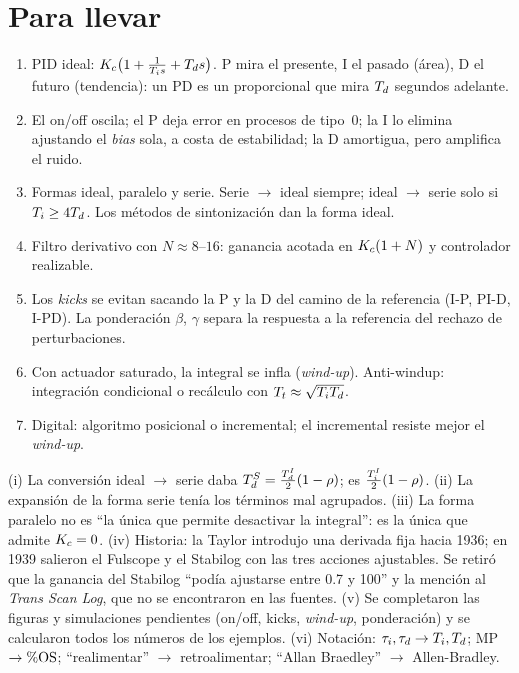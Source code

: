 \section{Para llevar}
\label{sec:pn-cierre}

\begin{parallevar}
\begin{enumerate}
  \item PID ideal: $K_c\bigl(1+\frac{1}{T_i s}+T_d s\bigr)$. P mira el presente, I el pasado (área), D el futuro (tendencia): un PD es un proporcional que mira $T_d$ segundos adelante.
  \item El on/off oscila; el P deja error en procesos de tipo~0; la I lo elimina ajustando el \emph{bias} sola, a costa de estabilidad; la D amortigua, pero amplifica el ruido.
  \item Formas ideal, paralelo y serie. Serie $\to$ ideal siempre; ideal $\to$ serie solo si $T_i\ge4T_d$. Los métodos de sintonización dan la forma ideal.
  \item Filtro derivativo con $N\approx8$--$16$: ganancia acotada en $K_c(1+N)$ y controlador realizable.
  \item Los \emph{kicks} se evitan sacando la P y la D del camino de la referencia (I-P, PI-D, I-PD). La ponderación $\beta$, $\gamma$ separa la respuesta a la referencia del rechazo de perturbaciones.
  \item Con actuador saturado, la integral se infla (\emph{wind-up}). Anti-windup: integración condicional o recálculo con $T_t\approx\sqrt{T_iT_d}$.
  \item Digital: algoritmo posicional o incremental; el incremental resiste mejor el \emph{wind-up}.
\end{enumerate}
\end{parallevar}

\begin{profundiza}
(i) La conversión ideal $\to$ serie daba $T_d^S=\frac{T_d^I}{2}(1-\rho)$; es $\frac{T_i^I}{2}(1-\rho)$. (ii) La expansión de la forma serie tenía los términos mal agrupados. (iii) La forma paralelo no es ``la única que permite desactivar la integral'': es la única que admite $K_c=0$. (iv) Historia: la Taylor introdujo una derivada fija hacia 1936; en 1939 salieron el Fulscope y el Stabilog con las tres acciones ajustables. Se retiró que la ganancia del Stabilog ``podía ajustarse entre 0.7 y 100'' y la mención al \emph{Trans Scan Log}, que no se encontraron en las fuentes. (v) Se completaron las figuras y simulaciones pendientes (on/off, kicks, \emph{wind-up}, ponderación) y se calcularon todos los números de los ejemplos. (vi) Notación: $\tau_i,\tau_d\to T_i,T_d$; MP $\to\%\mathrm{OS}$; ``realimentar'' $\to$ retroalimentar; ``Allan Braedley'' $\to$ Allen-Bradley.
\end{profundiza}

